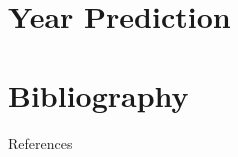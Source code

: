 \documentclass{beamer}
\begin{document}
\section{Year Prediction}





\section{Bibliography}

\begin{frame}[allowframebreaks]{References}

\nocite{*}
\printbibliography[heading=none]

\end{frame}

\thankframe
\end{document}
